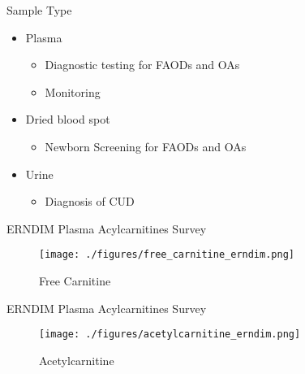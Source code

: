 \documentclass[presentation, smaller]{beamer}
\begin{document}
\begin{frame}[label={sec:orgheadline2}]{Sample Type}
\begin{itemize}
\item Plasma
\begin{itemize}
\item Diagnostic testing for FAODs and OAs
\item Monitoring
\end{itemize}
\item Dried blood spot
\begin{itemize}
\item Newborn Screening for FAODs and OAs
\end{itemize}
\item Urine
\begin{itemize}
\item Diagnosis of CUD
\end{itemize}
\end{itemize}
\end{frame}
\begin{frame}[label={sec:orgheadline3}]{ERNDIM Plasma Acylcarnitines Survey}
\begin{figure}[htb]
\centering
\texttt{[image: ./figures/free\_carnitine\_erndim.png]}
\caption{Free Carnitine}
\end{figure}
\end{frame}

\begin{frame}[label={sec:orgheadline4}]{ERNDIM Plasma Acylcarnitines Survey}
\begin{figure}[htb]
\centering
\texttt{[image: ./figures/acetylcarnitine\_erndim.png]}
\caption{Acetylcarnitine}
\end{figure}
\end{frame}
\end{document}
